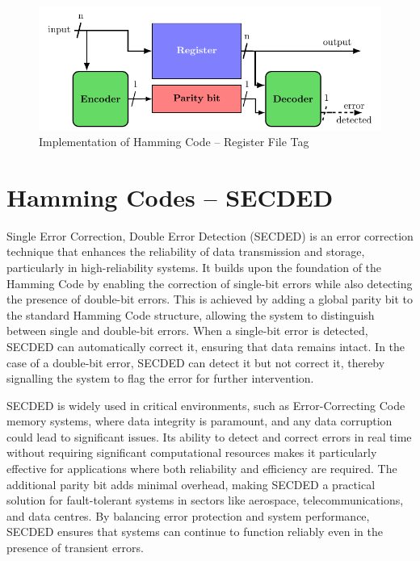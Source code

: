 \begin{figure}[ht]
    \centering
    \includegraphics[page=3, width=\textwidth]{c5_countermeasures_dift/img/archi_contremesures.pdf}
    \caption{Implementation of Hamming Code -- Register File Tag}
    \label{fig:implementation_hc_2}
\end{figure}


\section{Hamming Codes -- SECDED}
\label{section:chap5_secded}

Single Error Correction, Double Error Detection (SECDED) is an error correction technique that enhances the reliability of data transmission and storage, particularly in high-reliability systems. It builds upon the foundation of the Hamming Code by enabling the correction of single-bit errors while also detecting the presence of double-bit errors. This is achieved by adding a global parity bit to the standard Hamming Code structure, allowing the system to distinguish between single and double-bit errors. When a single-bit error is detected, SECDED can automatically correct it, ensuring that data remains intact. In the case of a double-bit error, SECDED can detect it but not correct it, thereby signalling the system to flag the error for further intervention.

SECDED is widely used in critical environments, such as Error-Correcting Code memory systems, where data integrity is paramount, and any data corruption could lead to significant issues. Its ability to detect and correct errors in real time without requiring significant computational resources makes it particularly effective for applications where both reliability and efficiency are required. The additional parity bit adds minimal overhead, making SECDED a practical solution for fault-tolerant systems in sectors like aerospace, telecommunications, and data centres. By balancing error protection and system performance, SECDED ensures that systems can continue to function reliably even in the presence of transient errors.

